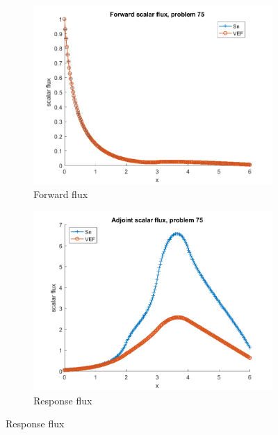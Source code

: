 \documentclass{article}
\begin{document}
\begin{figure}[H]
\label{Case75Flux}
\centering
\begin{subfigure}{.5\textwidth}
  \centering
  \includegraphics[width=.98\linewidth]{IanProposal/figures2/75phi.png}
  \caption{Forward flux}
  \label{fig:sfig1}
\end{subfigure}%
\begin{subfigure}{.5\textwidth}
  \centering
  \includegraphics[width=.98\linewidth]{IanProposal/figures2/75phia.png}
  \caption{Response flux}
  \label{fig:sfig4}
\end{subfigure}%
\end{figure}
\end{document}
